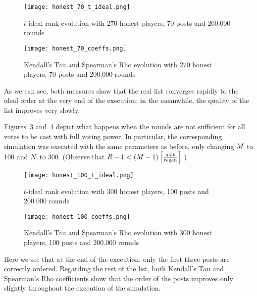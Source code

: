       \begin{figure}[!htbp]
        \texttt{[image: honest\_70\_t\_ideal.png]}
        \caption{$t$-ideal rank evolution with 270 honest players, 70 posts and
        200.000 rounds}
        \label{fig:honest:70:tideal}
      \end{figure}

      \begin{figure}[!htbp]
        \texttt{[image: honest\_70\_coeffs.png]}
        \caption{Kendall's Tau and Spearman's Rho evolution with 270 honest
        players, 70 posts and 200.000 rounds}
        \label{fig:honest:70:coeffs}
      \end{figure}

      As we can see, both measures show that the real list converges rapidly to
      the ideal order at the very end of the execution; in the meanwhile, the
      quality of the list improves very slowly.

      Figures~\ref{fig:honest:100:tideal} and~\ref{fig:honest:100:coeffs} depict
      what happens when the rounds are not sufficient for all votes to be cast
      with full voting power. In particular, the corresponding simulation was
      executed with the same parameters as before, only changing $\postlen$ to
      100 and $\playerlen$ to 300. (Observe that $\rounds - 1 < \left(\postlen -
      1\right)\ceil*{\frac{a + b}{\regen}}$.)

      \begin{figure}[!htbp]
        \texttt{[image: honest\_100\_t\_ideal.png]}
        \caption{$t$-ideal rank evolution with 300 honest players, 100 posts and
        200.000 rounds}
        \label{fig:honest:100:tideal}
      \end{figure}

      \begin{figure}[!htbp]
        \texttt{[image: honest\_100\_coeffs.png]}
        \caption{Kendall's Tau and Spearman's Rho evolution with 300 honest
        players, 100 posts and 200.000 rounds}
        \label{fig:honest:100:coeffs}
      \end{figure}

      Here we see that at the end of the execution, only the first three posts
      are correctly ordered. Regarding the rest of the list, both Kendall's Tau
      and Spearman's Rho coefficients show that the order of the posts improves
      only slightly throughout the execution of the simulation.

